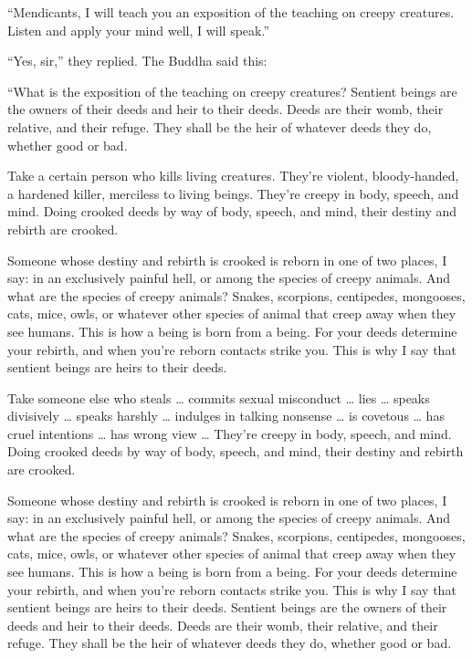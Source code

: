 \documentclass[12pt,openany]{book}%
\begin{document}
“Mendicants, I will teach you an exposition of the teaching on creepy creatures. Listen and apply your mind well, I will speak.” 

“Yes, sir,” they replied. The Buddha said this: 

“What is the exposition of the teaching on creepy creatures? Sentient beings are the owners of their deeds and heir to their deeds. Deeds are their womb, their relative, and their refuge. They shall be the heir of whatever deeds they do, whether good or bad. 

Take a certain person who kills living creatures. They’re violent, bloody-handed, a hardened killer, merciless to living beings. They’re creepy in body, speech, and mind. Doing crooked deeds by way of body, speech, and mind, their destiny and rebirth are crooked. 

Someone whose destiny and rebirth is crooked is reborn in one of two places, I say: in an exclusively painful hell, or among the species of creepy animals. And what are the species of creepy animals? Snakes, scorpions, centipedes, mongooses, cats, mice, owls, or whatever other species of animal that creep away when they see humans. This is how a being is born from a being. For your deeds determine your rebirth, and when you’re reborn contacts strike you. This is why I say that sentient beings are heirs to their deeds. 

Take someone else who steals … commits sexual misconduct … lies … speaks divisively … speaks harshly … indulges in talking nonsense … is covetous … has cruel intentions … has wrong view … They’re creepy in body, speech, and mind. Doing crooked deeds by way of body, speech, and mind, their destiny and rebirth are crooked. 

Someone whose destiny and rebirth is crooked is reborn in one of two places, I say: in an exclusively painful hell, or among the species of creepy animals. And what are the species of creepy animals? Snakes, scorpions, centipedes, mongooses, cats, mice, owls, or whatever other species of animal that creep away when they see humans. This is how a being is born from a being. For your deeds determine your rebirth, and when you’re reborn contacts strike you. This is why I say that sentient beings are heirs to their deeds. Sentient beings are the owners of their deeds and heir to their deeds. Deeds are their womb, their relative, and their refuge. They shall be the heir of whatever deeds they do, whether good or bad. 
\end{document}
